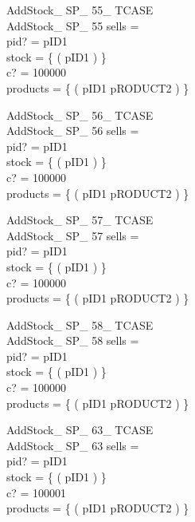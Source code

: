 \documentclass[fleqn,colorlinks,linkcolor=blue,citecolor=blue,urlcolor=blue]{article}
\newcommand{\negate}[0]{-}
\begin{document}
\begin{multicols}{2}
\begin{schema}{AddStock\_ SP\_ 55\_ TCASE}\\
 AddStock\_ SP\_ 55
\where
 sells =~\emptyset \\
 pid? = pID1 \\
 stock = \{ ( pID1  ) \} \\
 c? = 100000 \\
 products = \{ ( pID1 \mapsto pRODUCT2 ) \}
\end{schema}


\begin{schema}{AddStock\_ SP\_ 56\_ TCASE}\\
 AddStock\_ SP\_ 56
\where
 sells =~\emptyset \\
 pid? = pID1 \\
 stock = \{ ( pID1  ) \} \\
 c? = 100000 \\
 products = \{ ( pID1 \mapsto pRODUCT2 ) \}
\end{schema}


\begin{schema}{AddStock\_ SP\_ 57\_ TCASE}\\
 AddStock\_ SP\_ 57
\where
 sells =~\emptyset \\
 pid? = pID1 \\
 stock = \{ ( pID1  ) \} \\
 c? = 100000 \\
 products = \{ ( pID1 \mapsto pRODUCT2 ) \}
\end{schema}


\begin{schema}{AddStock\_ SP\_ 58\_ TCASE}\\
 AddStock\_ SP\_ 58
\where
 sells =~\emptyset \\
 pid? = pID1 \\
 stock = \{ ( pID1  ) \} \\
 c? = 100000 \\
 products = \{ ( pID1 \mapsto pRODUCT2 ) \}
\end{schema}


\begin{schema}{AddStock\_ SP\_ 63\_ TCASE}\\
 AddStock\_ SP\_ 63
\where
 sells =~\emptyset \\
 pid? = pID1 \\
 stock = \{ ( pID1 \mapsto \negate 4294967296 ) \} \\
 c? = 100001 \\
 products = \{ ( pID1 \mapsto pRODUCT2 ) \}
\end{schema}



\end{multicols}
\end{document}
